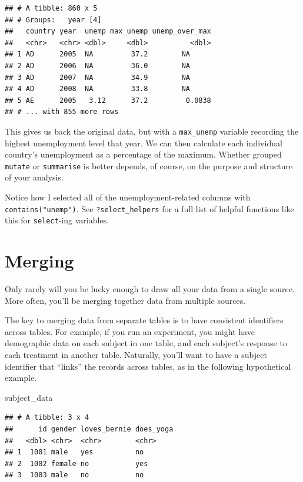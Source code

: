 \documentclass[
  12pt,
  oneside,openany]{book}
\newenvironment{Shaded}{\begin{snugshade}}{\end{snugshade}}
\newcommand{\NormalTok}[1]{#1}
\begin{document}
\begin{verbatim}
## # A tibble: 860 x 5
## # Groups:   year [4]
##   country year  unemp max_unemp unemp_over_max
##   <chr>   <chr> <dbl>     <dbl>          <dbl>
## 1 AD      2005  NA         37.2        NA     
## 2 AD      2006  NA         36.0        NA     
## 3 AD      2007  NA         34.9        NA     
## 4 AD      2008  NA         33.8        NA     
## 5 AE      2005   3.12      37.2         0.0838
## # ... with 855 more rows
\end{verbatim}

This gives us back the original data, but with a \texttt{max\_unemp} variable recording the highest unemployment level that year. We can then calculate each individual country's unemployment as a percentage of the maximum. Whether grouped \texttt{mutate} or \texttt{summarise} is better depends, of course, on the purpose and structure of your analysis.

Notice how I selected all of the unemployment-related columns with \texttt{contains("unemp")}. See \texttt{?select\_helpers} for a full list of helpful functions like this for \texttt{select}-ing variables.

\hypertarget{merging}{%
\section{Merging}\label{merging}}

Only rarely will you be lucky enough to draw all your data from a single source. More often, you'll be merging together data from multiple sources.

The key to merging data from separate tables is to have consistent identifiers across tables. For example, if you run an experiment, you might have demographic data on each subject in one table, and each subject's response to each treatment in another table. Naturally, you'll want to have a subject identifier that ``links'' the records across tables, as in the following hypothetical example.

\begin{Shaded}
\begin{Highlighting}[]
\NormalTok{subject\_data}
\end{Highlighting}
\end{Shaded}

\begin{verbatim}
## # A tibble: 3 x 4
##      id gender loves_bernie does_yoga
##   <dbl> <chr>  <chr>        <chr>    
## 1  1001 male   yes          no       
## 2  1002 female no           yes      
## 3  1003 male   no           no
\end{verbatim}
\end{document}
